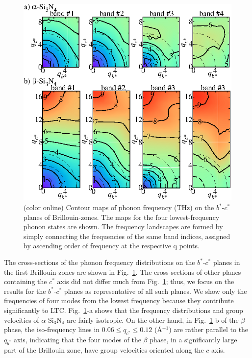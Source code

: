 \documentclass[twocolumn,amsmath,amssymb,a4paper,prb,superscriptaddress,floatfix]{revtex4-1}
\begin{document}
\begin{figure}[ht]
 \centerins
  \includegraphics[width=\linewidth]{Fig2_small.eps} \caption{(color
  online) Contour maps of phonon frequency (THz) on the $b^*$-$c^*$
  planes of Brillouin-zones. The maps for the four lowest-frequency
  phonon states are shown. The frequency landscapes are formed by simply
  connecting the frequencies of the same band indices, assigned by
  ascending order of frequency at the respective q
  points. \label{fig:Fig3_338} }
 \centering
\end{figure}

The cross-sections of the phonon frequency distributions on the $b^*$-$c^*$
planes in the first Brillouin-zones are shown in Fig.~\ref{fig:Fig3_338}. 
The cross-sections of other planes containing the $c^*$ axis did not differ
much from Fig.~\ref{fig:Fig3_338}; thus, we focus on the results for the
$b^*$-$c^*$ planes as representative of all such planes. We show only the
frequencies of four modes from the lowest frequency because they contribute
significantly to LTC.
Fig.~\ref{fig:Fig3_338}-a shows that the frequency distributions and group
velocities of $\alpha$-Si$_3$N$_4$ are fairly isotropic. 
On the other hand, in Fig.~\ref{fig:Fig3_338}-b of the $\beta$ phase, the
iso-frequency lines in $0.06 \le q_{c^*} \le 0.12$ (\AA$^{-1}$) are rather
parallel to the $q_{b^*}$ axis, indicating that the four modes of the $\beta$ phase,
in a significantly large part of the Brillouin zone, have group velocities
oriented along the $c$ axis.
\end{document}
